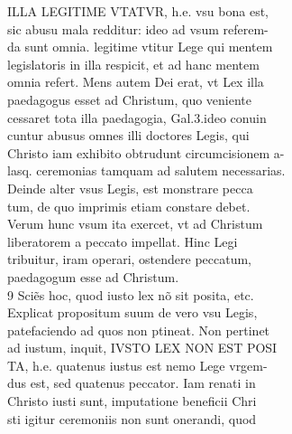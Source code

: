 \documentclass{article}
\begin{document}
\begin{pages}
                ILLA LEGITIME VTATVR, h.e. vsu bona est, \\
                sic abusu mala redditur: ideo ad vsum referem- \\
                da sunt omnia. legitime vtitur Lege qui mentem \\
                legislatoris in illa respicit, et ad hanc mentem \\
                omnia refert. Mens autem Dei erat, vt Lex illa \\
                paedagogus esset ad Christum, quo veniente \\
                cessaret tota illa paedagogia, Gal.3.ideo conuin \\
                cuntur abusus omnes illi doctores Legis, qui \\
                Christo iam exhibito obtrudunt circumcisionem a- \\
                lasq. ceremonias tamquam ad salutem necessarias. \\
                Deinde alter vsus Legis, est monstrare pecca \\
                tum, de quo imprimis etiam constare debet. \\
                Verum hunc vsum ita exercet, vt ad Christum \\
                liberatorem a peccato impellat. Hinc Legi \\
                tribuitur, iram operari, ostendere peccatum, \\
                paedagogum esse ad Christum. \\
                9 Sciẽs hoc, quod iusto lex nõ sit posita, etc. \\
                Explicat propositum suum de vero vsu Legis, \\
                patefaciendo ad quos non ptineat. Non pertinet \\
                ad iustum, inquit, IVSTO LEX NON EST POSI \\
                TA, h.e. quatenus iustus est nemo Lege vrgem- \\
                dus est, sed quatenus peccator. Iam renati in \\
                Christo iusti sunt, imputatione beneficii Chri \\
                sti igitur ceremoniis non sunt onerandi, quod \\

\end{pages}
\end{document}
